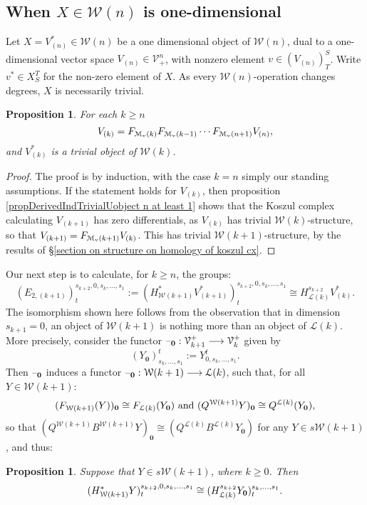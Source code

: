 \documentclass[11pt]{amsart}
\theoremstyle{plain}
\newtheorem{prop}[thm]{Proposition}
\theoremstyle{definition}
\newcommand{\DASH}{\textup{--}}
\renewcommand{\to}{\longrightarrow}
\newcommand{\calW}{\mathcal{W}}
\newcommand{\calL}{\mathcal{L}}
\newcommand{\calV}{\mathcal{V}}
\newcommand{\calM}{\mathcal{M}}
\newcommand{\calMv}{\mathcal{M}_\textup{v}}
\theoremstyle{plain}
\newcommand{\vect}[2]{\calV^{#1}_{#2}}
\begin{document}
\begin{Calculations of HWn for n nonzero}
\subsection{When $X\in\calW(n)$ is one-dimensional}
Let $X=V^*_{(n)}\in\calW(n)$ be a one dimensional object of $\calW(n)$, %
dual to a one-dimensional vector space $V_{(n)}\in\vect{n}{+}$, with nonzero element $v\in(V_{(n)})^S_T$. Write $v^*\in X^T_{S}$ for the non-zero element of $X$. As every $\calW(n)$-operation changes degrees, $X$ is necessarily trivial.
\begin{prop}\label{iterative calc of the Vk all trivial}
For each $k\geq n$
\[V_{(k)}=F_{\calMv(k)}F_{\calMv(k-1)}\cdots F_{\calMv(n+1)}V_{(n)},\]
and $V^*_{(k)}$ is a trivial object of $\calW(k)$.
\end{prop}
\begin{proof}
The proof is by induction, with the case $k=n$ simply our standing assumptions. If the statement holds for $V_{(k)}$, then proposition \ref{propDerivedIndTrivialUobject n at least 1} shows that the Koszul complex calculating $V_{(k+1)}$ has zero differentials, as $V_{(k)}$ has trivial $\calW(k)$-structure, so that $V_{(k+1)}=F_{\calM_{\textup{v}}(k+1)}V_{(k)}$. This has trivial $\calW(k+1)$-structure, by the results of \S\ref{section on structure on homology of koszul cx}.
\end{proof}
Our next step is to calculate, for $k\geq n$, the groups:
\[(E_{2,(k+1)})^{s_{k+2},0,s_k,\ldots,s_1}_{t}:=(H^*_{\calW(k+1)}V^*_{(k+1)})^{s_{k+2},0,s_k,\ldots,s_1}_{t}\cong H^{s_{k+2}}_{\calL(k)}V^*_{(k)}.\]
The isomorphism shown here follows from the observation that in dimension $s_{k+1}=0$, an object of $\calW(k+1)$ is nothing more than an object of $\calL(k)$. More precisely, consider the functor $\DASH_\textbf{0}:\vect{+}{k+1}\to \vect{+}{k}$ given by
\[(Y_\textbf{0})^t_{s_k,\ldots,s_1}:=Y^t_{0,s_k,\ldots,s_1}.\]
Then $\DASH_\textbf{0}$ induces a functor $\DASH_\textbf{0}:\calW(k+1)\to \calL(k)$, such that, for all $Y\in\calW(k+1)$:
\[(F_{\calW(k+1)}(Y))_\textbf{0}\cong F_{\calL(k)}(Y_\textbf{0})\textup{ and }(Q^{\calW(k+1)}Y)_\textbf{0}\cong Q^{\calL(k)}(Y_\textbf{0}),\]
so that $(Q^{\calW(k+1)}B^{\calW(k+1)}Y)_{\textbf{0}}\cong(Q^{\calL(k)}B^{\calL(k)}Y_{\textbf{0}})$ for any $Y\in s\calW(k+1)$, and thus:
\begin{prop}
Suppose that $Y\in s\calW(k+1)$, where $k\geq0$. Then
\[(H^*_{\calW(k+1)}Y)^{s_{k+2},0,s_k,\ldots,s_1}_{t}\cong (H^{s_{k+2}}_{\calL(k)}Y_\textup{\textbf{0}})^{s_k,\ldots,s_1}_t.\]

\end{prop}
\end{Calculations of HWn for n nonzero}
\end{document}
